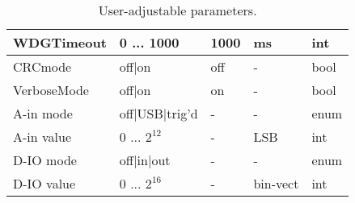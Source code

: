 \begin{table}[H]
\begin{tabular}{l|p{65mm}|l|l|l}
			WDGTimeout			& 0 ... 1000					& 1000			& ms		& int	\\ \hline
			CRCmode				& off|on						& off			& -			& bool	\\ \hline
			VerboseMode			& off|on						& on			& -			& bool	\\ \hline
			A-in mode			& off|USB|trig'd 				& -				& -			& enum	\\ \hline
			A-in value			& 0 ... $2^{12}$				& -				& LSB		& int	\\ \hline
			D-IO mode			& off|in|out 					& -				& -			& enum	\\ \hline
			D-IO value			& 0 ... $2^{16}$				& -				& bin-vect	& int	\\ \hline
					\end{tabular}
				\caption{User-adjustable parameters.}
			\label{tab:params}
		\end{table}

